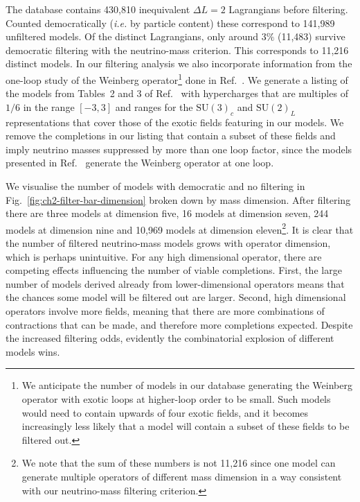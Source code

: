 The database contains 430,810 inequivalent $\Delta L = 2$ Lagrangians before
filtering. Counted democratically (\textit{i.e.} by particle content) these
correspond to 141,989 unfiltered models. Of the distinct Lagrangians, only
around $3\%$ (11,483) survive democratic filtering with the neutrino-mass
criterion. This corresponds to 11,216 distinct models. In our filtering analysis
we also incorporate information from the one-loop study of the Weinberg
operator\footnote{We anticipate the number of models in our database generating
  the Weinberg operator with exotic loops at higher-loop order to be small. Such
  models would need to contain upwards of four exotic fields, and it becomes
  increasingly less likely that a model will contain a subset of these fields to
  be filtered out.} done in Ref.~\cite{Bonnet:2012kz}. We generate a listing of
the models from Tables~2 and 3 of Ref.~\cite{Bonnet:2012kz} with hypercharges
that are multiples of $1/6$ in the range $[-3,3]$ and ranges for the
$\mathrm{SU}(3)_{c}$ and $\mathrm{SU}(2)_{L}$ representations that cover those
of the exotic fields featuring in our models. We remove the completions in our
listing that contain a subset of these fields and imply neutrino masses
suppressed by more than one loop factor, since the models presented in
Ref.~\cite{Bonnet:2012kz} generate the Weinberg operator at one loop.

We visualise the number of models with democratic and no filtering in
Fig.~\ref{fig:ch2-filter-bar-dimension} broken down by mass dimension. After
filtering there are three models at dimension five, 16 models at dimension
seven, 244 models at dimension nine and 10,969 models at dimension
eleven\footnote{We note that the sum of these numbers is not 11,216 since one
  model can generate multiple operators of different mass dimension in a way
  consistent with our neutrino-mass filtering criterion.}. It is clear that the
number of filtered neutrino-mass models grows with operator dimension, which is
perhaps unintuitive. For any high dimensional operator, there are competing
effects influencing the number of viable completions. First, the large number of
models derived already from lower-dimensional operators means that the chances
some model will be filtered out are larger. Second, high dimensional operators
involve more fields, meaning that there are more combinations of contractions
that can be made, and therefore more completions expected. Despite the increased
filtering odds, evidently the combinatorial explosion of different models wins.

